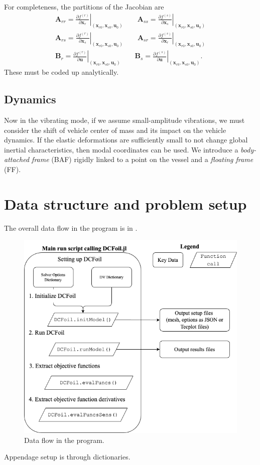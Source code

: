 \documentclass[10pt]{article}
\newcommand{\pp}[2]{\frac{\partial #1}{\partial #2}}
\newcommand{\mbf}[1]{\mathbf{#1}}
\newcommand{\beq}{\begin{equation}\begin{aligned}}
\newcommand{\eeq}{\end{aligned}\end{equation}}
\begin{document}
For completeness, the partitions of the Jacobian are
\beq
\mbf{A}_{rr} = \left. \pp{f^{(r)}}{\mbf{x}_r} \right|_{(\mbf{x}_{r0}, \mbf{x}_{s0}, \mbf{u}_0)}
\qquad
\mbf{A}_{ss} = \left. \pp{f^{(s)}}{\mbf{x}_s} \right|_{(\mbf{x}_{r0}, \mbf{x}_{s0}, \mbf{u}_0)}
\\
\mbf{A}_{rs} = \left. \pp{f^{(r)}}{\mbf{x}_s} \right|_{(\mbf{x}_{r0}, \mbf{x}_{s0}, \mbf{u}_0)}
\qquad
\mbf{A}_{sr} = \left. \pp{f^{(s)}}{\mbf{x}_r} \right|_{(\mbf{x}_{r0}, \mbf{x}_{s0}, \mbf{u}_0)}
\\
\mbf{B}_{r} = \left. \pp{f^{(r)}}{\mbf{u}} \right|_{(\mbf{x}_{r0}, \mbf{x}_{s0}, \mbf{u}_0)}
\qquad
\mbf{B}_{s} = \left. \pp{f^{(s)}}{\mbf{u}} \right|_{(\mbf{x}_{r0}, \mbf{x}_{s0}, \mbf{u}_0)}.
\eeq
These must be coded up analytically.

\subsection{Dynamics}
Now in the vibrating mode, if we assume small-amplitude vibrations, we must consider the shift of vehicle center of mass and its impact on the vehicle dynamics.
If the elastic deformations are sufficiently small to not change global inertial characteristics, then modal coordinates can be used.
We introduce a \emph{body-attached frame} (BAF) rigidly linked to a point on the vessel and a \emph{floating frame} (FF).

\section{Data structure and problem setup}

The overall data flow in the program is in .
\begin{figure}[htb!]
    \centering
    \includegraphics[width=0.5\linewidth,clip,trim={0cm 0cm 0cm 0cm}]{dataFlow.png}
    \caption{\label{fig:DataFlow}Data flow in the program.}
\end{figure}
Appendage setup is through dictionaries.
\end{document}
